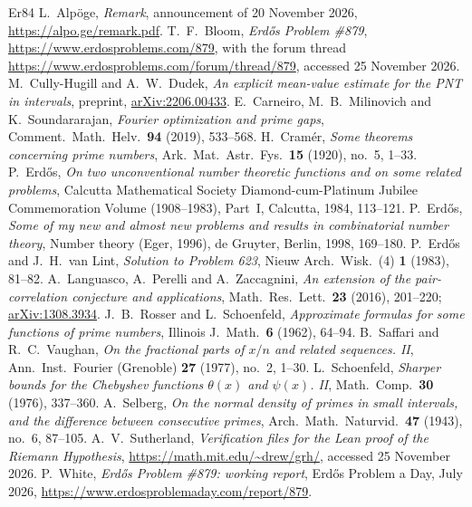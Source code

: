 \documentclass[11pt,reqno]{amsart}
\theoremstyle{definition}
\theoremstyle{remark}
\numberwithin{equation}{section}
\begin{document}
\begin{thebibliography}{Er84}
 L.~Alp\"oge, \emph{Remark}, announcement of 20 November 2026, \url{https://alpo.ge/remark.pdf}.
 T.~F.~Bloom, \emph{Erd\H{o}s Problem \#879}, \url{https://www.erdosproblems.com/879}, with the forum thread \url{https://www.erdosproblems.com/forum/thread/879}, accessed 25 November 2026.
 M.~Cully-Hugill and A.~W.~Dudek, \emph{An explicit mean-value estimate for the PNT in intervals}, preprint, \href{https://arxiv.org/abs/2206.00433}{arXiv:2206.00433}.
 E.~Carneiro, M.~B.~Milinovich and K.~Soundararajan, \emph{Fourier optimization and prime gaps}, Comment.\ Math.\ Helv.\ \textbf{94} (2019), 533--568.
 H.~Cram\'er, \emph{Some theorems concerning prime numbers}, Ark.\ Mat.\ Astr.\ Fys.\ \textbf{15} (1920), no.~5, 1--33.
 P.~Erd\H{o}s, \emph{On two unconventional number theoretic functions and on some related problems}, Calcutta Mathematical Society Diamond-cum-Platinum Jubilee Commemoration Volume (1908--1983), Part~I, Calcutta, 1984, 113--121.
 P.~Erd\H{o}s, \emph{Some of my new and almost new problems and results in combinatorial number theory}, Number theory (Eger, 1996), de Gruyter, Berlin, 1998, 169--180.
 P.~Erd\H{o}s and J.~H.~van Lint, \emph{Solution to Problem 623}, Nieuw Arch.\ Wisk.\ (4) \textbf{1} (1983), 81--82.
 A.~Languasco, A.~Perelli and A.~Zaccagnini, \emph{An extension of the pair-correlation conjecture and applications}, Math.\ Res.\ Lett.\ \textbf{23} (2016), 201--220; \href{https://arxiv.org/abs/1308.3934}{arXiv:1308.3934}.
 J.~B.~Rosser and L.~Schoenfeld, \emph{Approximate formulas for some functions of prime numbers}, Illinois J.\ Math.\ \textbf{6} (1962), 64--94.
 B.~Saffari and R.~C.~Vaughan, \emph{On the fractional parts of $x/n$ and related sequences. II}, Ann.\ Inst.\ Fourier (Grenoble) \textbf{27} (1977), no.~2, 1--30.
 L.~Schoenfeld, \emph{Sharper bounds for the Chebyshev functions $\theta(x)$ and $\psi(x)$. II}, Math.\ Comp.\ \textbf{30} (1976), 337--360.
 A.~Selberg, \emph{On the normal density of primes in small intervals, and the difference between consecutive primes}, Arch.\ Math.\ Naturvid.\ \textbf{47} (1943), no.~6, 87--105.
 A.~V.~Sutherland, \emph{Verification files for the Lean proof of the Riemann Hypothesis}, \url{https://math.mit.edu/~drew/grh/}, accessed 25 November 2026.
 P.~White, \emph{Erd\H{o}s Problem \#879: working report}, Erd\H{o}s Problem a Day, July 2026, \url{https://www.erdosproblemaday.com/report/879}.
\end{thebibliography}
\end{document}
